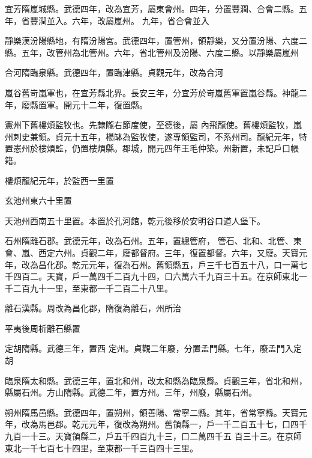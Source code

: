 \begin{pinyinscope}
 宜芳隋嵐城縣。武德四年，改為宜芳，屬東會州。四年，分置豐潤、合會二縣。五年，省豐潤並入。六年，改屬嵐州。
 九年，省合會並入



 靜樂漢汾陽縣地，有隋汾陽宮。武德四年，置管州，領靜樂，又分置汾陽、六度二縣。五年，改管州為北管州。六年，省北管州及汾陽、六度二縣。以靜樂屬嵐州



 合河隋臨泉縣。武德四年，置臨津縣。貞觀元年，改為合河



 嵐谷舊岢嵐軍也，在宜芳縣北界。長安三年，分宜芳於岢嵐舊軍置嵐谷縣。神龍二年，廢縣置軍。開元十二年，復置縣。



 憲州下舊樓煩監牧也。先隸隴右節度使，至德後，屬
 內飛龍使。舊樓煩監牧，嵐州刺史兼領。貞元十五年，楊缽為監牧使，遂專領監司，不系州司。龍紀元年，特置憲州於樓煩監，仍置樓煩縣。郡城，開元四年王毛仲築。州新置，未記戶口帳籍。



 樓煩龍紀元年，於監西一里置



 玄池州東六十里置



 天池州西南五十里置。本置於孔河館，乾元後移於安明谷口道人堡下。



 石州隋離石郡。武德元年，改為石州。五年，置總管府，
 管石、北和、北管、東會、嵐、西定六州。貞觀二年，廢都督府。三年，復置都督。六年，又廢。天寶元年，改為昌化郡。乾元元年，復為石州。舊領縣五，戶三千七百五十八，口一萬七千四百二。天寶，戶一萬四千二百九十四，口六萬六千九百三十五。在京師東北一千二百九十一里，至東都一千二百二十八里。



 離石漢縣。周改為昌化郡，隋復為離石，州所治



 平夷後周析離石縣置



 定胡隋縣。武德三年，置西
 定州。貞觀二年廢，分置孟門縣。七年，廢孟門入定胡



 臨泉隋太和縣。武德三年，置北和州，改太和縣為臨泉縣。貞觀三年，省北和州，縣屬石州。方山隋縣。武德二年，置方州。三年，州廢，縣屬石州。



 朔州隋馬邑縣。武德四年，置朔州，領善陽、常寧二縣。其年，省常寧縣。天寶元年，改為馬邑郡。乾元元年，復改為朔州。舊領縣一，戶一千二百五十七，口四千九百一十三。天寶領縣二，戶五千四百九十三，口二萬四千五
 百三十三。在京師東北一千七百七十四里，至東都一千三百四十三里。




\end{pinyinscope}
